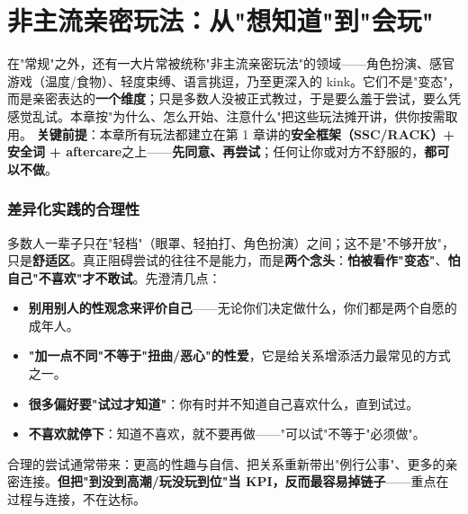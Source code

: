 \documentclass[12pt,UTF8,openany]{ctexbook}
\begin{document}
\chapter{非主流亲密玩法：从"想知道"到"会玩"}
在"常规"之外，还有一大片常被统称"非主流亲密玩法"的领域——角色扮演、感官游戏（温度/食物）、轻度束缚、语言挑逗，乃至更深入的 kink。它们不是"变态"，而是亲密表达的\textbf{一个维度}；只是多数人没被正式教过，于是要么羞于尝试，要么凭感觉乱试。本章按"为什么、怎么开始、注意什么"把这些玩法摊开讲，供你按需取用。
\textbf{关键前提}：本章所有玩法都建立在第 1 章讲的\textbf{安全框架（SSC/RACK）+ 安全词 + aftercare}之上——\textbf{先同意、再尝试}；任何让你或对方不舒服的，\textbf{都可以不做}。
\subsection*{差异化实践的合理性}
多数人一辈子只在"轻档"（眼罩、轻拍打、角色扮演）之间；这不是"不够开放"，只是\textbf{舒适区}。真正阻碍尝试的往往不是能力，而是\textbf{两个念头}：\textbf{怕被看作"变态"}、\textbf{怕自己"不喜欢"才不敢试}。先澄清几点：
\begin{itemize}[leftmargin=2em,itemsep=0.3em]
  \item \textbf{别用别人的性观念来评价自己}——无论你们决定做什么，你们都是两个自愿的成年人。
  \item \textbf{"加一点不同"不等于"扭曲/恶心"的性爱}，它是给关系增添活力最常见的方式之一。
  \item \textbf{很多偏好要"试过才知道"}：你有时并不知道自己喜欢什么，直到试过。
  \item \textbf{不喜欢就停下}：知道不喜欢，就不要再做——"可以试"不等于"必须做"。
\end{itemize}
合理的尝试通常带来：更高的性趣与自信、把关系重新带出"例行公事"、更多的亲密连接。\textbf{但把"到没到高潮/玩没玩到位"当 KPI，反而最容易掉链子}——重点在过程与连接，不在达标。
\end{document}
